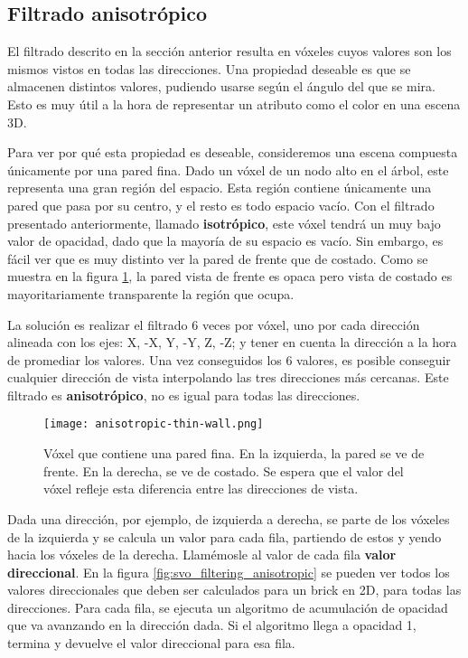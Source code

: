 
\subsection{Filtrado anisotrópico}

El filtrado descrito en la sección anterior resulta en vóxeles cuyos valores son los mismos vistos en todas las direcciones.
Una propiedad deseable es que se almacenen distintos valores, pudiendo usarse según el ángulo del que se mira.
Esto es muy útil a la hora de representar un atributo como el color en una escena 3D.

Para ver por qué esta propiedad es deseable, consideremos una escena compuesta únicamente por una pared fina.
Dado un vóxel de un nodo alto en el árbol, este representa una gran región del espacio.
Esta región contiene únicamente una pared que pasa por su centro, y el resto es todo espacio vacío.
Con el filtrado presentado anteriormente, llamado \textbf{isotrópico}, este vóxel tendrá un muy bajo valor de opacidad, dado que la mayoría de su espacio es vacío.
Sin embargo, es fácil ver que es muy distinto ver la pared de frente que de costado.
Como se muestra en la figura \ref{fig:anisotropic-thin-wall}, la pared vista de frente es opaca pero vista de costado es mayoritariamente transparente la región que ocupa.

La solución es realizar el filtrado 6 veces por vóxel, uno por cada dirección alineada con los ejes: X, -X, Y, -Y, Z, -Z; y tener en cuenta la dirección a la hora de promediar los valores.
Una vez conseguidos los 6 valores, es posible conseguir cualquier dirección de vista interpolando las tres direcciones más cercanas.
Este filtrado es \textbf{anisotrópico}, no es igual para todas las direcciones.

\begin{figure}
    \centering
    \texttt{[image: anisotropic-thin-wall.png]}
    \caption{
        Vóxel que contiene una pared fina.
        En la izquierda, la pared se ve de frente.
        En la derecha, se ve de costado.
        Se espera que el valor del vóxel refleje esta diferencia entre las direcciones de vista.
    }
    \label{fig:anisotropic-thin-wall}
\end{figure}

Dada una dirección, por ejemplo, de izquierda a derecha, se parte de los vóxeles de la izquierda y se calcula un valor para cada fila, partiendo de estos y yendo hacia los vóxeles de la derecha.
Llamémosle al valor de cada fila \textbf{valor direccional}.
En la figura \ref{fig:svo_filtering_anisotropic} se pueden ver todos los valores direccionales que deben ser calculados para un brick en 2D, para todas las direcciones.
Para cada fila, se ejecuta un algoritmo de acumulación de opacidad que va avanzando en la dirección dada.
Si el algoritmo llega a opacidad 1, termina y devuelve el valor direccional para esa fila.

